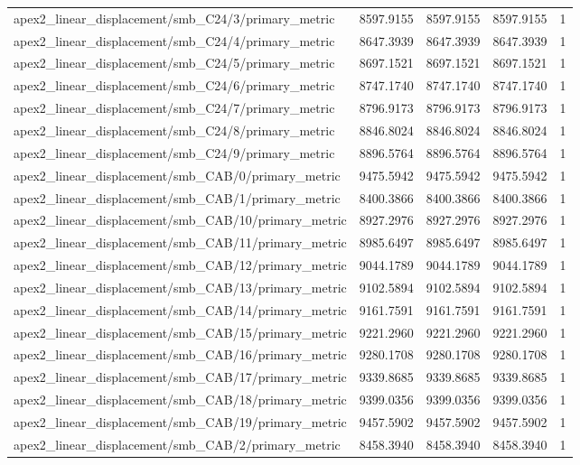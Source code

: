 \begin{table}[h]
\begin{tabular}{lrrrr}
apex2_linear_displacement/smb_C24/3/primary_metric & 8597.9155 & 8597.9155 & 8597.9155 & 1 \\
apex2_linear_displacement/smb_C24/4/primary_metric & 8647.3939 & 8647.3939 & 8647.3939 & 1 \\
apex2_linear_displacement/smb_C24/5/primary_metric & 8697.1521 & 8697.1521 & 8697.1521 & 1 \\
apex2_linear_displacement/smb_C24/6/primary_metric & 8747.1740 & 8747.1740 & 8747.1740 & 1 \\
apex2_linear_displacement/smb_C24/7/primary_metric & 8796.9173 & 8796.9173 & 8796.9173 & 1 \\
apex2_linear_displacement/smb_C24/8/primary_metric & 8846.8024 & 8846.8024 & 8846.8024 & 1 \\
apex2_linear_displacement/smb_C24/9/primary_metric & 8896.5764 & 8896.5764 & 8896.5764 & 1 \\
apex2_linear_displacement/smb_CAB/0/primary_metric & 9475.5942 & 9475.5942 & 9475.5942 & 1 \\
apex2_linear_displacement/smb_CAB/1/primary_metric & 8400.3866 & 8400.3866 & 8400.3866 & 1 \\
apex2_linear_displacement/smb_CAB/10/primary_metric & 8927.2976 & 8927.2976 & 8927.2976 & 1 \\
apex2_linear_displacement/smb_CAB/11/primary_metric & 8985.6497 & 8985.6497 & 8985.6497 & 1 \\
apex2_linear_displacement/smb_CAB/12/primary_metric & 9044.1789 & 9044.1789 & 9044.1789 & 1 \\
apex2_linear_displacement/smb_CAB/13/primary_metric & 9102.5894 & 9102.5894 & 9102.5894 & 1 \\
apex2_linear_displacement/smb_CAB/14/primary_metric & 9161.7591 & 9161.7591 & 9161.7591 & 1 \\
apex2_linear_displacement/smb_CAB/15/primary_metric & 9221.2960 & 9221.2960 & 9221.2960 & 1 \\
apex2_linear_displacement/smb_CAB/16/primary_metric & 9280.1708 & 9280.1708 & 9280.1708 & 1 \\
apex2_linear_displacement/smb_CAB/17/primary_metric & 9339.8685 & 9339.8685 & 9339.8685 & 1 \\
apex2_linear_displacement/smb_CAB/18/primary_metric & 9399.0356 & 9399.0356 & 9399.0356 & 1 \\
apex2_linear_displacement/smb_CAB/19/primary_metric & 9457.5902 & 9457.5902 & 9457.5902 & 1 \\
apex2_linear_displacement/smb_CAB/2/primary_metric & 8458.3940 & 8458.3940 & 8458.3940 & 1 \\

\end{tabular}
\end{table}
